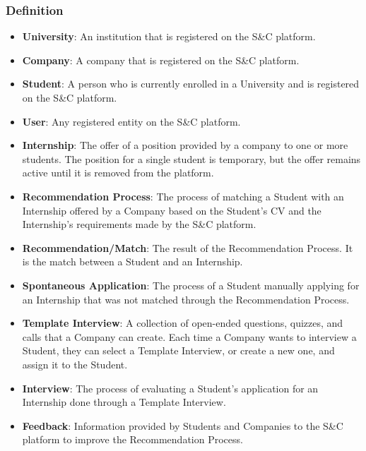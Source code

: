 \subsubsection{Definition}
\begin{itemize}
    \item \textcolor{titleColor}{\textbf{University}\label{def:university}}: An institution that is registered on the S\&C platform.
    \item \textcolor{titleColor}{\textbf{Company}\label{def:company}}: A company that is registered on the S\&C platform.
    \item \textcolor{titleColor}{\textbf{Student}\label{def:student}}: A person who is currently enrolled in a University and is registered on the S\&C platform.
    \item \textcolor{titleColor}{\textbf{User}\label{def:user}}: Any registered entity on the S\&C platform.
    \item \textcolor{titleColor}{\textbf{Internship}\label{def:internship}}: The offer of a position provided by a company to one or more students. The position for a single student is temporary, but the offer remains active until it is removed from the platform.
    \item \textcolor{titleColor}{\textbf{Recommendation Process}}\label{def:recommendationProcess}: The process of matching a Student with an Internship offered by a Company based on the Student's CV and the Internship's requirements made by the S\&C platform.
    \item \textcolor{titleColor}{\textbf{Recommendation/Match}\label{def:match}}: The result of the Recommendation Process. It is the match between a Student and an Internship.
    \item \textcolor{titleColor}{\textbf{Spontaneous Application}\label{def:spontaneousApplication}}: The process of a Student manually applying for an Internship that was not matched through the Recommendation Process.
    \item \textcolor{titleColor}{\textbf{Template Interview}\label{def:templateInterview}}: A collection of open-ended questions, quizzes, and calls that a Company can create. Each time a Company wants to interview a Student, they can select a Template Interview, or create a new one, and assign it to the Student.
    \item \textcolor{titleColor}{\textbf{Interview}\label{def:Interview}}: The process of evaluating a Student's application for an Internship done through a Template Interview.
    \item \textcolor{titleColor}{\textbf{Feedback}\label{def:Feedback}}: Information provided by Students and Companies to the S\&C platform to improve the Recommendation Process.

\end{itemize}
